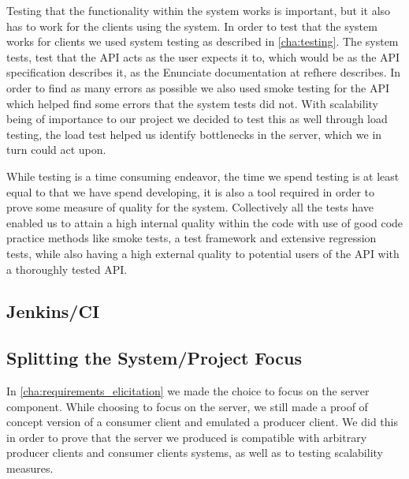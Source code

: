 \bigskip
Testing that the functionality within the system works is important, but it also has to work for the clients using the system.
In order to test that the system works for clients we used system testing as described in \cref{cha:testing}.
The system tests, test that the API acts as the user expects it to, which would be as the API specification describes it, as the Enunciate documentation at refhere describes.
In order to find as many errors as possible we also used smoke testing for the API which helped find some errors that the system tests did not.
With scalability being of importance to our project we decided to test this as well through load testing, the load test helped us identify bottlenecks in the server, which we in turn could act upon.

While testing is a time consuming endeavor, the time we spend testing is at least equal to that we have spend developing, it is also a tool required in order to prove some measure of quality for the system.
Collectively all the tests have enabled us to attain a high internal quality within the code with use of good code practice methods like smoke tests, a test framework and extensive regression tests, while also having a high external quality to potential users of the API with a thoroughly tested API.



\subsection{Jenkins/CI}
\subsection{Splitting the System/Project Focus}
In \cref{cha:requirements_elicitation} we made the choice to focus on the server component.
While choosing to focus on the server, we still made a proof of concept version of a consumer client and emulated a producer client.
We did this in order to prove that the server we produced is compatible with arbitrary producer clients and consumer clients systems, as well as to testing scalability measures.


